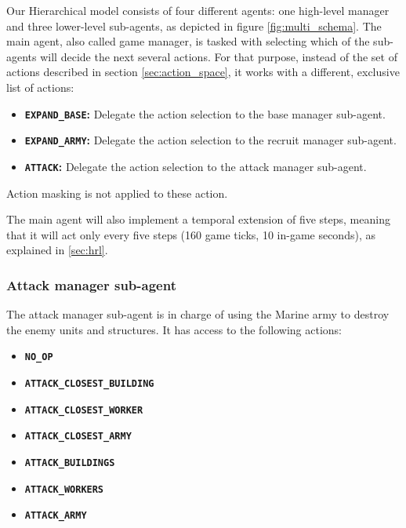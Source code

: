 Our Hierarchical model consists of four different agents: one high-level manager and three lower-level sub-agents, as depicted in figure \ref{fig:multi_schema}. The main agent, also called game manager, is tasked with selecting which of the sub-agents will decide the next several actions. For that purpose, instead of the set of actions described in section \ref{sec:action_space}, it works with a different, exclusive list of actions:

\begin{itemize}
    \item \textbf{\texttt{EXPAND\_BASE}:} Delegate the action selection to the base manager sub-agent.
    \item \textbf{\texttt{EXPAND\_ARMY}:} Delegate the action selection to the recruit manager sub-agent.
    \item \textbf{\texttt{ATTACK}:} Delegate the action selection to the attack manager sub-agent.
\end{itemize}

Action masking is not applied to these action.

The main agent will also implement a temporal extension of five steps, meaning that it will act only every five steps (160 game ticks, 10 in-game seconds), as explained in \ref{sec:hrl}.

\subsubsection*{Attack manager sub-agent}

The attack manager sub-agent is in charge of using the Marine army to destroy the enemy units and structures. It has access to the following actions:

\begin{multicols}{2}
\begin{itemize}
    \item \textbf{\texttt{NO\_OP}}
    \item \textbf{\texttt{ATTACK\_CLOSEST\_BUILDING}}
    \item \textbf{\texttt{ATTACK\_CLOSEST\_WORKER}}
    \item \textbf{\texttt{ATTACK\_CLOSEST\_ARMY}}
    \item \textbf{\texttt{ATTACK\_BUILDINGS}}
    \item \textbf{\texttt{ATTACK\_WORKERS}}
    \item \textbf{\texttt{ATTACK\_ARMY}}
\end{itemize}
\end{multicols}

